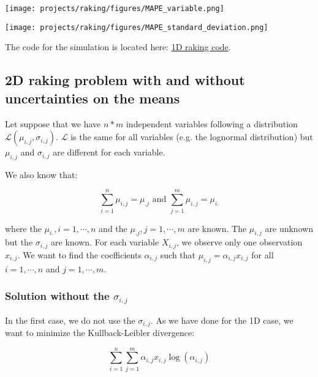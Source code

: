 \texttt{[image: projects/raking/figures/MAPE\_variable.png]}

\texttt{[image: projects/raking/figures/MAPE\_standard\_deviation.png]}

The code for the simulation is located here: \href{https://github.com/ADucellierIHME/raking_1Dtoy}{1D raking code}.

\subsection{2D raking problem with and without uncertainties on the means}

Let suppose that we have $n * m$ independent variables following a distribution $\mathcal{L} \left(\mu_{i,j} , \sigma_{i,j} \right)$. $\mathcal{L}$ is the same for all variables (e.g. the lognormal distribution) but $\mu_{i,j}$ and $\sigma_{i,j}$ are different for each variable.

We also know that:

\begin{equation*}
\sum_{i = 1}^n \mu_{i,j} = \mu_{.j} \text{ and } \sum_{j = 1}^m \mu_{i,j} = \mu_{i.}
\end{equation*}

where the $\mu_{i.} , i = 1 ,\cdots , n$ and the $\mu_{.j} , j = 1 , \cdots , m$ are known. The $\mu_{i,j}$ are unknown but the $\sigma_{i,j}$ are known. For each variable $X_{i,j}$, we observe only one observation $x_{i,j}$. We want to find the coefficients $\alpha_{i,j}$ such that $\mu_{i,j} = \alpha_{i,j} x_{i,j}$ for all $i = 1 , \cdots , n$ and $j = 1 , \cdots , m$.

\subsubsection{Solution without the $\sigma_{i,j}$}

In the first case, we do not use the $\sigma_{i,j}$. As we have done for the 1D case, we want to minimize the Kullback-Leibler divergence:

\begin{equation*}
\sum_{i = 1}^n \sum_{j = 1}^m \alpha_{i,j} x_{i,j} \log \left( \alpha_{i,j} \right)
\end{equation*}

